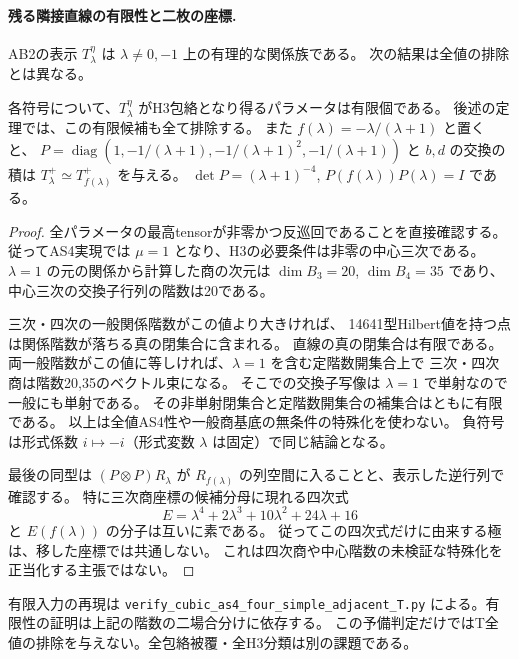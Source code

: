 \paragraph{残る隣接直線の有限性と二枚の座標.}
AB2の表示 $T^\eta_\lambda$ は $\lambda\ne0,-1$ 上の有理的な関係族である。
次の結果は全値の排除とは異なる。
\begin{proposition}\label{prop:cubic-adjacent-T-finite}
各符号について、$T^\eta_\lambda$ がH3包絡となり得るパラメータは有限個である。
後述の定理では、この有限候補も全て排除する。
また $f(\lambda)=-\lambda/(\lambda+1)$ と置くと、
$P=\operatorname{diag}(1,-1/(\lambda+1),-1/(\lambda+1)^2,-1/(\lambda+1))$
と $b,d$ の交換の積は $T^+_\lambda\simeq T^+_{f(\lambda)}$ を与える。
$\det P=(\lambda+1)^{-4}$, $P(f(\lambda))P(\lambda)=I$ である。
\end{proposition}
\begin{proof}
全パラメータの最高tensorが非零かつ反巡回であることを直接確認する。
従ってAS4実現では $\mu=1$ となり、H3の必要条件は非零の中心三次である。
$\lambda=1$ の元の関係から計算した商の次元は
$\dim B_3=20$, $\dim B_4=35$ であり、中心三次の交換子行列の階数は20である。

三次・四次の一般関係階数がこの値より大きければ、
14641型Hilbert値を持つ点は関係階数が落ちる真の閉集合に含まれる。
直線の真の閉集合は有限である。
両一般階数がこの値に等しければ、$\lambda=1$ を含む定階数開集合上で
三次・四次商は階数20,35のベクトル束になる。
そこでの交換子写像は $\lambda=1$ で単射なので一般にも単射である。
その非単射閉集合と定階数開集合の補集合はともに有限である。
以上は全値AS4性や一般商基底の無条件の特殊化を使わない。
負符号は形式係数 $i\mapsto-i$（形式変数 $\lambda$ は固定）で同じ結論となる。

最後の同型は $(P\otimes P)R_\lambda$ が
$R_{f(\lambda)}$ の列空間に入ることと、表示した逆行列で確認する。
特に三次商座標の候補分母に現れる四次式
\[
 E=\lambda^4+2\lambda^3+10\lambda^2+24\lambda+16
\]
と $E(f(\lambda))$ の分子は互いに素である。
従ってこの四次式だけに由来する極は、移した座標では共通しない。
これは四次商や中心階数の未検証な特殊化を正当化する主張ではない。
\end{proof}
有限入力の再現は
\texttt{verify\_\allowbreak{}cubic\_\allowbreak{}as4\_\allowbreak{}four\_\allowbreak{}simple\_\allowbreak{}adjacent\_\allowbreak{}T.py}
による。有限性の証明は上記の階数の二場合分けに依存する。
この予備判定だけではT全値の排除を与えない。全包絡被覆・全H3分類は別の課題である。

